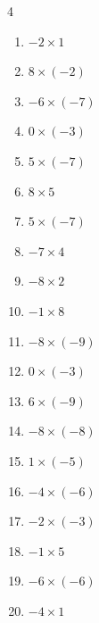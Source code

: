 \begin{multicols}{4}
\begin{enumerate}
  \item $-2\times 1$
        \phantom{$=-2$}

  \item $8\times (-2)$
        \phantom{$=-16$}

  \item $-6\times (-7)$
        \phantom{$=42$}

  \item $0\times (-3)$
        \phantom{$=0$}

  \item $5\times (-7)$
        \phantom{$=-35$}

  \item $8\times 5$
        \phantom{$=40$}

  \item $5\times (-7)$
        \phantom{$=-35$}

  \item $-7\times 4$
        \phantom{$=-28$}

  \item $-8\times 2$
        \phantom{$=-16$}

  \item $-1\times 8$
        \phantom{$=-8$}

  \item $-8\times (-9)$
        \phantom{$=72$}

\columnbreak %

  \item $0\times (-3)$
        \phantom{$=0$}

  \item $6\times (-9)$
        \phantom{$=-54$}

  \item $-8\times (-8)$
        \phantom{$=64$}

  \item $1\times (-5)$
        \phantom{$=-5$}

  \item $-4\times (-6)$
        \phantom{$=24$}

  \item $-2\times (-3)$
        \phantom{$=6$}

  \item $-1\times 5$
        \phantom{$=-5$}

  \item $-6\times (-6)$
        \phantom{$=36$}

  \item $-4\times 1$
        \phantom{$=-4$}


\end{enumerate}
\end{multicols}
